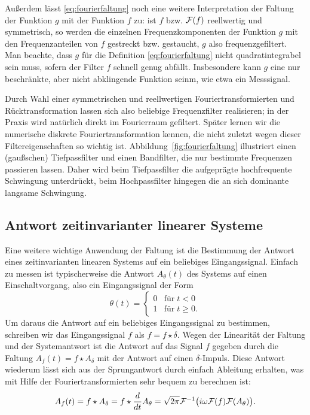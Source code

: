 Außerdem lässt \eqref{eq:fourierfaltung} noch eine weitere
Interpretation der Faltung der Funktion $g$ mit der Funktion $f$ zu:
ist $f$ bzw. $\mathcal F(f)$ reellwertig und symmetrisch, so werden die
einzelnen Frequenzkomponenten der Funktion $g$ mit den
Frequenzanteilen von $f$ gestreckt bzw. gestaucht, $g$ also
frequenzgefiltert. Man beachte, dass $g$ für die Definition
\eqref{eq:fourierfaltung} nicht quadratintegrabel sein muss, sofern
der Filter $f$ schnell genug abfällt. Insbesondere kann $g$ eine nur
beschränkte, aber nicht abklingende Funktion seinm, wie etwa ein
Messsignal.

Durch Wahl einer symmetrischen und reellwertigen
Fouriertransformierten und Rücktransformation lassen sich also
beliebige Frequenzfilter realisieren; in der Praxis wird natürlich
direkt im Fourierraum gefiltert. Später lernen wir die numerische
diskrete Fouriertransformation kennen, die nicht zuletzt wegen dieser
Filtereigenschaften so wichtig ist. Abbildung~\ref{fig:fourierfaltung}
illustriert einen (gaußschen) Tiefpassfilter und einen Bandfilter, die
nur bestimmte Frequenzen passieren lassen. Daher wird beim
Tiefpassfilter die aufgeprägte hochfrequente Schwingung unterdrückt,
beim Hochpassfilter hingegen die an sich dominante langsame
Schwingung.

\subsection{Antwort zeitinvarianter linearer Systeme}

Eine weitere wichtige Anwendung der Faltung ist die Bestimmung der
Antwort eines zeitinvarianten linearen Systems auf ein beliebiges
Eingangssignal. Einfach zu messen ist typischerweise die Antwort
$A_\theta(t)$ des Systems auf einen Einschaltvorgang, also ein
Eingangssignal der Form
\begin{equation}
  \theta(t) =
  \begin{cases}
    0 & \text{für}\; t < 0\\
    1 & \text{für}\; t \ge 0.
  \end{cases}
\end{equation}
Um daraus die Antwort auf ein beliebiges Eingangssignal zu bestimmen,
schreiben wir das Eingangssignal $f$ als $f = f \star \delta$. Wegen
der Linearität der Faltung und der Systemantwort ist die Antwort auf
das Signal $f$ gegeben durch die Faltung $A_f(t) = f \star A_\delta$
mit der Antwort auf einen $\delta$-Impuls. Diese Antwort wiederum
lässt sich aus der Sprungantwort durch einfach Ableitung erhalten, was
mit Hilfe der Fouriertransformierten sehr bequem zu berechnen ist:
\begin{equation}
  A_f(t) = f \star A_\delta = f \star
  \frac{d}{dt} A_\theta = \sqrt{2\pi} \mathcal F^{-1}\bigl( i\omega \mathcal F(f) \mathcal F(A_\theta)\bigr).
\end{equation}

